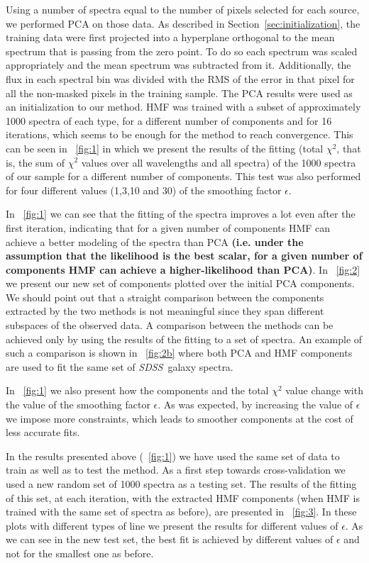 \documentclass[12pt,preprint]{aastex}
\newcommand{\project}[1]{\textsl{#1}}
\newcommand{\sdss}{\project{SDSS}}
\newcommand{\SDSS}{\sdss}
\newcommand{\sectionname}{Section}
\begin{document}
Using a number of spectra equal to the number of pixels selected for
each source, we performed PCA on those data. As described in 
\sectionname~\ref{sec:initialization}, the training data were
first projected into a hyperplane orthogonal to the mean
spectrum that is passing from the zero point. To do so each spectrum 
was scaled appropriately and the mean spectrum was subtracted from it. 
Additionally, the flux in each spectral bin was divided
with the RMS of the error in that pixel for all the non-masked pixels in
the training sample. The PCA results were used as an initialization to
our method. HMF was trained with a subset of approximately 1000
spectra of each type, for a different number of components and for 16
iterations, which seems to be enough for the method to reach convergence. This
can be seen in \figurename~\ref{fig:1} in which we present the results of
the fitting (total $\chi^2$, that is, the sum of $\chi^2$ values over all
wavelengths and all spectra) of the 1000 spectra of our sample for a
different number of components. This test was also performed for four
different values (1,3,10 and 30) of the smoothing factor $\epsilon$.

In \figurename~\ref{fig:1} we can see that the fitting of the spectra
improves a lot even after the first iteration, indicating that for a 
given number of components HMF can achieve a better modeling of the 
spectra than PCA \textbf{(i.e. under the assumption that the likelihood is the best 
scalar, for a given number of components HMF can achieve a higher-likelihood than PCA)}. 
In \figurename~\ref{fig:2} 
we present our new set of components plotted over the
initial PCA components. We should point out that a straight comparison
between the components extracted by the two methods is not meaningful
since they span different subspaces of the observed data. A 
comparison between the methods can be achieved only by using
the results of the fitting to a set of spectra. An example of such a 
comparison is shown in \figurename~\ref{fig:2b} where both PCA and HMF 
components are used to fit the same set of \SDSS\ galaxy spectra.

In \figurename~\ref{fig:1} we also present how the components and the
total $\chi^2$ value change with the value of the smoothing factor
$\epsilon$. As was expected, by increasing the value of $\epsilon$ we 
impose more constraints, which leads to smoother components at the 
cost of less accurate fits. 

In the results presented above (\figurename~\ref{fig:1}) we have used
the same set of data to train as well as to test the method. As a
first step towards cross-validation we used a new random set of 1000
spectra as a testing set. The results of the fitting of this set, at
each iteration, with the extracted HMF components (when HMF is 
trained with the same set of spectra as before), are presented in
\figurename~\ref{fig:3}. In these plots with different types of line
we present the results for different values of $\epsilon$. As we can
see in the new test set, the best fit is achieved by different values
of $\epsilon$ and not for the smallest one as before.
\end{document}
